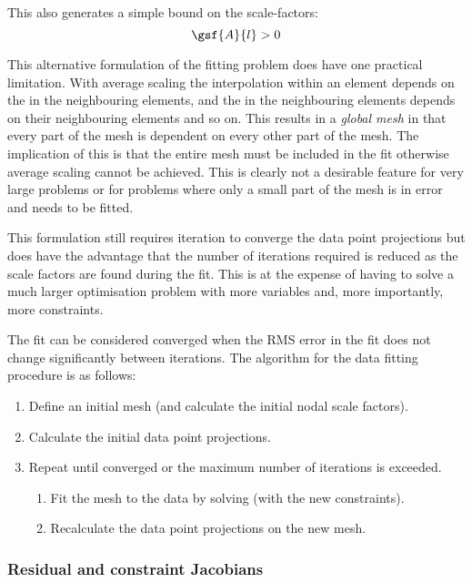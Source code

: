 This also generates a simple bound on the scale-factors:
\begin{equation}
  \gsf{A}{l} > 0
\end{equation}

This alternative formulation of the \nonlin fitting problem does have one
practical limitation. With average \arclen scaling the interpolation within an
element depends on the \arclen in the neighbouring elements, and the \arclen
in the neighbouring elements depends on their neighbouring elements and so on.
This results in a \emph{global mesh} in that every part of the mesh is
dependent on every other part of the mesh. The implication of this is that the
entire mesh must be included in the fit otherwise average \arclen scaling
cannot be achieved. This is clearly not a desirable feature for very large
problems or for problems where only a small part of the mesh is in error and
needs to be fitted. 

This formulation still requires iteration to converge the data point
projections but does have the advantage that the number of iterations required
is reduced as the scale factors are found during the fit. This is at the
expense of having to solve a much larger \nonlin optimisation problem with
more variables and, more importantly, more \nonlin constraints.

The fit can be considered converged when the RMS error in the fit does not
change significantly between iterations.  The algorithm for the \nonlin data
fitting procedure is as follows:
\begin{enumerate}
\item Define an initial mesh (and calculate the initial nodal scale factors).
\item Calculate the initial data point projections.
\item Repeat until converged or the maximum number of iterations is exceeded.
  \begin{enumerate}
  \item Fit the mesh to the data by solving  (with
    the new constraints).
  \item Recalculate the data point projections on the new mesh.
  \end{enumerate}
\end{enumerate}

\subsubsection{Residual and constraint Jacobians}
\label{sec:resandcontjacs}

